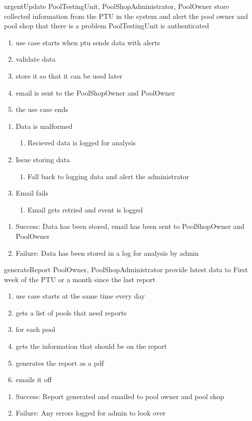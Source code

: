 \usecase
{urgentUpdate}
{PoolTestingUnit, PoolShopAdministrator, PoolOwner}
{store collected information from the PTU in the system and alert the pool owner and pool shop that there is a problem}
{PoolTestingUnit is authenticated}
{
\begin{enumerate}
\item use case starts when ptu sends data with alerts
\item validate data
\item store it so that it can be used later
\item email is sent to the PoolShopOwner and PoolOwner
\item the use case ends
\end{enumerate}
}
{
\begin{enumerate}
\item Data is malformed
\begin{enumerate}
\item Recieved data is logged for analysis
\end{enumerate}
\item Issue storing data
\begin{enumerate}
\item Fall back to logging data and alert the administrator
\end{enumerate}
\item Email fails
\begin{enumerate}
\item Email gets retried and event is logged
\end{enumerate}
\end{enumerate}
}
{
\begin{enumerate}
\item Success: Data has been stored, email has been sent to PoolShopOwner and PoolOwner
\item Failure: Data has been stored in a log for analysis by admin
\end{enumerate}
}

\usecase
{generateReport}
{PoolOwner, PoolShopAdministrator}
{provide latest data to }
{First week of the PTU or a month since the last report}
{
\begin{enumerate}
\item use case starts at the same time every day
\item gets a list of pools that need reports
\item for each pool
\item gets the information that should be on the report
\item generates the report as a pdf
\item emails it off
\end{enumerate}
}
{}
{
\begin{enumerate}
\item Success: Report generated and emailed to pool owner and pool shop
\item Failure: Any errors logged for admin to look over
\end{enumerate}
}

